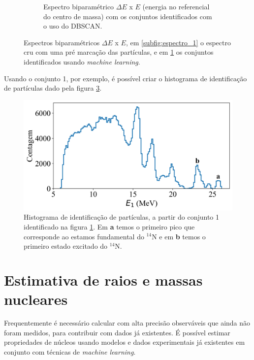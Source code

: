 \documentclass[a4paper,12pt,oneside]{book}
\begin{document}
\begin{appendices}
\begin{figure}[H]
\begin{subfigure}[t]{0.48\textwidth}
        \caption{Espectro biparamétrico $\Delta E$ x $E$ (energia no referencial do centro de massa) com os conjuntos identificados com o uso do DBSCAN.}
        \label{subfig:espectro_2}
    \end{subfigure}
\caption{Espectros biparamétricos $\Delta E$ x $E$, em \ref{subfig:espectro_1} o espectro cru com uma pré marcação das partículas, e em \ref{subfig:espectro_2} os conjuntos identificados usando \textit{machine learning}.}
\label{fig:espectros_ex_ml}
\end{figure}

\par Usando o conjunto 1, por exemplo, é possível criar o histograma de identificação de partículas dado pela figura \ref{fig:PID_hist}.

\begin{figure}[H]
    \centering
    \includegraphics[scale=0.11]{figs/espectro_3.png}
    \caption{Histograma de identificação de partículas, a partir do conjunto 1 identificado na figura \ref{subfig:espectro_2}. Em \textbf{a} temos o primeiro pico que corresponde ao estamos fundamental do $^{14}$N e em \textbf{b} temos o primeiro estado excitado do $^{14}$N.}
    \label{fig:PID_hist}
\end{figure}

\section{Estimativa de raios e massas nucleares}

\par Frequentemente é necessário calcular com alta precisão observáveis que ainda não foram medidos, para contribuir com dados já existentes. É possível estimar propriedades de núcleos usando modelos e dados experimentais já existentes em conjunto com técnicas de \textit{machine learning}.


\end{appendices}
\end{document}
